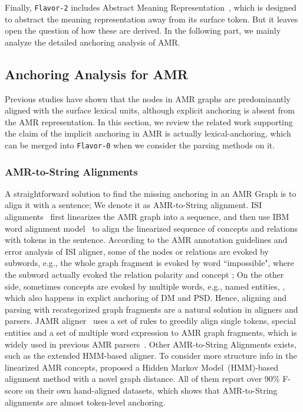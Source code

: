 Finally, \texttt{Flavor-2} includes Abstract Meaning
Representation~\cite[AMR,][]{Banarescu:LWPjKI7N}, which is designed to
abstract the meaning representation away from its surface token. But
it leaves open the question of how these are derived. In the following
part, we mainly analyze the detailed anchoring analysis of AMR.

\subsection{Anchoring Analysis for AMR}
\label{ssec:lex-phr:amr-anchor}
Previous studies have shown that the nodes in AMR graphs are
predominantly aligned with the surface lexical units, although
explicit anchoring is absent from the AMR representation.  In this
section, we review the related work supporting the claim of the
implicit anchoring in AMR is actually lexical-anchoring, which can be
merged into \texttt{Flavor-0} when we consider the parsing methods on
it.

\subsubsection{AMR-to-String Alignments}
\label{sssec:lex-phr:amr-to-string}
A straightforward solution to find the missing anchoring in an AMR
Graph is to align it with a sentence; We denote it as AMR-to-String
alignment. ISI alignments~\cite{Pourdamghani:2014aligning} first
linearizes the AMR graph into a sequence, and then use IBM word
alignment model~\cite{brown1993mathematics} to align the linearized
sequence of concepts and relations with tokens in the
sentence. According to the AMR annotation guidelines and error
analysis of ISI aligner, some of the nodes or relations are evoked by
subwords, e.g., the whole graph fragment  is evoked by word ``impossible", where the subword
 actually evoked the relation polarity and concept
\tquoted{-}; On the other side, sometimes concepts are evoked by
multiple words, e.g., named entities, , which also happens in explict anchoring
of DM and PSD. Hence, aligning and parsing with recategorized graph
fragments are a natural solution in aligners and parsers. JAMR
aligner~\cite{Flanigan:2014vc} uses a set of rules to greedily align
single tokens, special entities and a set of multiple word expression
to AMR graph fragments, which is widely used in previous AMR
parsers~\cite[\eg][]{Flanigan:2014vc,Wang:2015uo,Artzi:2009tb,Pust:2015ug,Peng:2015tj,Konstas:2017uj,Wang:2017vt}. Other
AMR-to-String Alignments exists, such as the extended HMM-based
aligner. To consider more structure info in the linearized AMR
concepts, \citet{Wang:2017vt} proposed a Hidden Markov
Model~(HMM)-based alignment method with a novel graph distance. All of
them report over 90\% F-score on their own hand-aligned datasets,
which shows that AMR-to-String alignments are almost token-level
anchoring.

